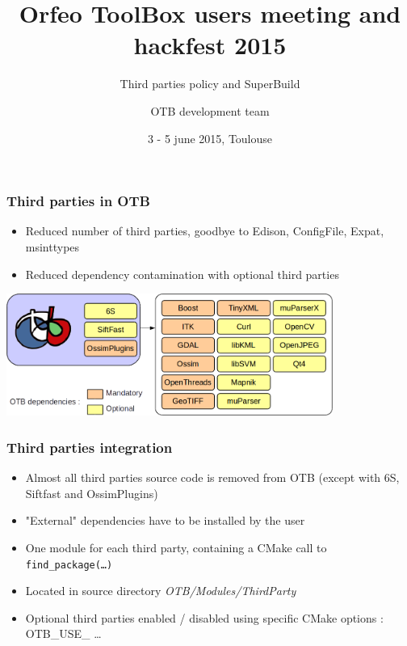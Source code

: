\documentclass[8pt]{beamer}
\title{Orfeo ToolBox users meeting and hackfest 2015}
\subtitle{Third parties policy and SuperBuild}
\author{OTB development team}%
\date{3 - 5 june 2015, Toulouse}
\begin{document}
\begin{frame}
\titlepage
\end{frame}

\begin{frame}
\frametitle{Third parties in OTB}

\begin{itemize}
\item Reduced number of third parties, goodbye to Edison, ConfigFile, Expat, msinttypes
\item Reduced dependency contamination with optional third parties
\end{itemize}

\begin{center}
\includegraphics[height=4cm]{images/otb_3rd_parties}
\end{center}

\end{frame}

\begin{frame}
\frametitle{Third parties integration}

\begin{itemize}
\item Almost all third parties source code is removed from OTB (except with 6S, Siftfast and OssimPlugins)
\item "External" dependencies have to be installed by the user
\item One module for each third party, containing a CMake call to \texttt{find\_package(\ldots)}
\item Located in source directory \emph{OTB/Modules/ThirdParty}
\item Optional third parties enabled / disabled using specific CMake options : OTB\_USE\_ \ldots
\end{itemize}



\end{frame}
\end{document}
